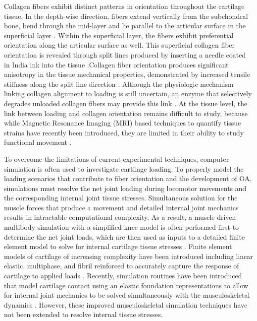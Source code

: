 Collagen fibers exhibit distinct patterns in orientation throughout the cartilage tissue. In the depth-wise direction, fibers extend vertically from the subchondral bone, bend through the mid-layer and lie parallel to the articular surface in the superficial layer \cite{Benninghoff1925}. Within the superficial layer, the fibers exhibit preferential orientation along the articular surface as well. This superficial collagen fiber orientation is revealed through split lines produced by inserting a needle coated in India ink into the tissue \cite{Below2002,Benninghoff1925,Responte2007}.Collagen fiber orientation produces significant anisotropy in the tissue mechanical properties, demonstrated by increased tensile stiffness along the split line direction \cite{Sasazaki2006}.  Although the physiologic mechanism linking collagen alignment to loading is still uncertain, an enzyme that selectively degrades unloaded collagen fibers may provide this link \cite{Nabeshima1996,Ruberti2005}. At the tissue level, the link between loading and collagen orientation remains difficult to study, because while Magnetic Resonance Imaging (MRI) based techniques to quantify tissue strains have recently been introduced, they are limited in their ability to study functional movement \cite{Lad2016,Chan2016}.

To overcome the limitations of current experimental techniques, computer simulation is often used to investigate cartilage loading. To properly model the loading scenarios that contribute to fiber orientation and the development of OA, simulations must resolve the net joint loading during locomotor movements and the corresponding internal joint tissue stresses. Simultaneous solution for the muscle forces that produce a movement and detailed internal joint mechanics results in intractable computational complexity. As a result, a muscle driven multibody simulation with a simplified knee model is often performed first to determine the net joint loads, which are then used as inputs to a detailed finite element model to solve for internal cartilage tissue stresses \cite{Halloran2012,besier2005modeling,klodowski2016merge}. Finite element models of cartilage of increasing complexity have been introduced including linear elastic, multiphase, and fibril reinforced to accurately capture the response of cartilage to applied loads \cite{Halloran2012,klika2016overview,Julkunen2013}. Recently, simulation routines have been introduced that model cartilage contact using an elastic foundation representations to allow for internal joint mechanics to be solved simultaneously with the musculoskeletal dynamics \cite{Smith2016influence2,Lenhart2015,Marra2015,Guess2013}. However, these improved musculoskeletal simulation techniques have not been extended to resolve internal tissue stresses.

